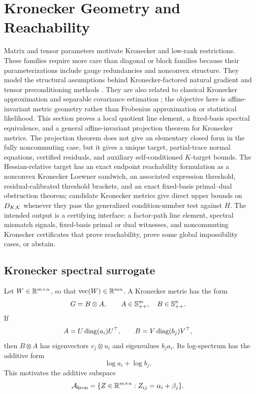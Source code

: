 \section{Kronecker Geometry and Reachability}
\label{sec:kron-lowrank}

Matrix and tensor parameters motivate Kronecker and low-rank restrictions.
These families require more care than diagonal or block families because their
parameterizations include gauge redundancies and nonconvex structure.
They model the structural assumptions behind Kronecker-factored natural
gradient and tensor preconditioning methods \cite{martens2015kfac,gupta2018shampoo}.
They are also related to classical Kronecker approximation and separable
covariance estimation \cite{vanloan1993kronecker,dutilleul1999mle,
werner2008kronecker}; the objective here is affine-invariant metric geometry
rather than Frobenius approximation or statistical likelihood.
This section proves a local quotient line element, a fixed-basis spectral
equivalence, and a general affine-invariant projection theorem for Kronecker
metrics. The projection theorem does not give an elementary closed form in the
fully noncommuting case, but it gives a unique target, partial-trace normal
equations, certified residuals, and auxiliary self-conditioned \(K\)-target
bounds. The Hessian-relative target has an exact endpoint reachability
formulation as a nonconvex Kronecker Loewner sandwich, an associated
expression threshold, residual-calibrated threshold brackets, and an exact
fixed-basis primal--dual obstruction theorem; candidate Kronecker metrics give
direct upper bounds on \(D_{K,\mathcal K}\) whenever they pass the generalized
condition-number test against \(H\). The intended output is a certifying
interface: a factor-path line element, spectral mismatch signals, fixed-basis
primal or dual witnesses, and noncommuting Kronecker certificates that prove
reachability, prove some global impossibility cases, or abstain.

\subsection{Kronecker spectral surrogate}

Let \(W\in\mathbb R^{m\times n}\), so that \(\operatorname{vec}(W)\in\mathbb R^{mn}\). A
Kronecker metric has the form
\[
  G=B\otimes A,\qquad A\in\mathbb S_{++}^m,\quad B\in\mathbb S_{++}^n.
\]
If
\[
  A=U\operatorname{diag}(a_i)U^\top,\qquad B=V\operatorname{diag}(b_j)V^\top,
\]
then \(B\otimes A\) has eigenvectors \(v_j\otimes u_i\) and eigenvalues
\(b_j a_i\). Its log-spectrum has the additive form
\[
  \log a_i+\log b_j.
\]
This motivates the additive subspace
\[
  \mathcal A_{\mathrm{kron}}
  =
  \{Z\in\mathbb R^{m\times n}:Z_{ij}=\alpha_i+\beta_j\}.
\]

